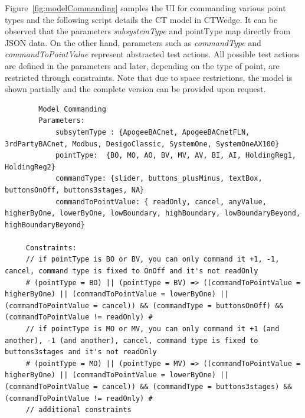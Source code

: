 \documentclass[conference]{IEEEtran}
\begin{document}
	Figure~\ref{fig:modelCommanding} samples the UI for commanding various point types and the following script details the CT model in CTWedge.
	It can be observed that the parameters \emph{subsystemType} and \emph{}{pointType} map directly from JSON data.
	On the other hand, parameters such as \emph{commandType} and \emph{commandToPointValue} represent abstracted test actions.
	All possible test actions are defined in the parameters and later, depending on the type of point, are restricted through constraints.
	Note that due to space restrictions, the model is shown partially and the complete version can be provided upon request.
	
	\begin{lstlisting}
		Model Commanding
		Parameters:
			subsytemType : {ApogeeBACnet, ApogeeBACnetFLN, 3rdPartyBACnet, Modbus, DesigoClassic, SystemOne, SystemOneAX100}
			pointType:  {BO, MO, AO, BV, MV, AV, BI, AI, HoldingReg1, HoldingReg2}  
			commandType: {slider, buttons_plusMinus, textBox, buttonsOnOff, buttons3stages, NA}
			commandToPointValue: { readOnly, cancel, anyValue, higherByOne, lowerByOne, lowBoundary, highBoundary, lowBoundaryBeyond, highBoundaryBeyond}
			
	 Constraints:
	 // if pointType is BO or BV, you can only command it +1, -1, cancel, command type is fixed to OnOff and it's not readOnly
	 # (pointType = BO) || (pointType = BV) => ((commandToPointValue = higherByOne) || (commandToPointValue = lowerByOne) || (commandToPointValue = cancel)) && (commandType = buttonsOnOff) && (commandToPointValue != readOnly) # 
	 // if pointType is MO or MV, you can only command it +1 (and another), -1 (and another), cancel, command type is fixed to buttons3stages and it's not readOnly
	 # (pointType = MO) || (pointType = MV) => ((commandToPointValue = higherByOne) || (commandToPointValue = lowerByOne) || (commandToPointValue = cancel)) && (commandType = buttons3stages) && (commandToPointValue != readOnly) # 
	 // additional constraints
	\end{lstlisting}
\end{document}

